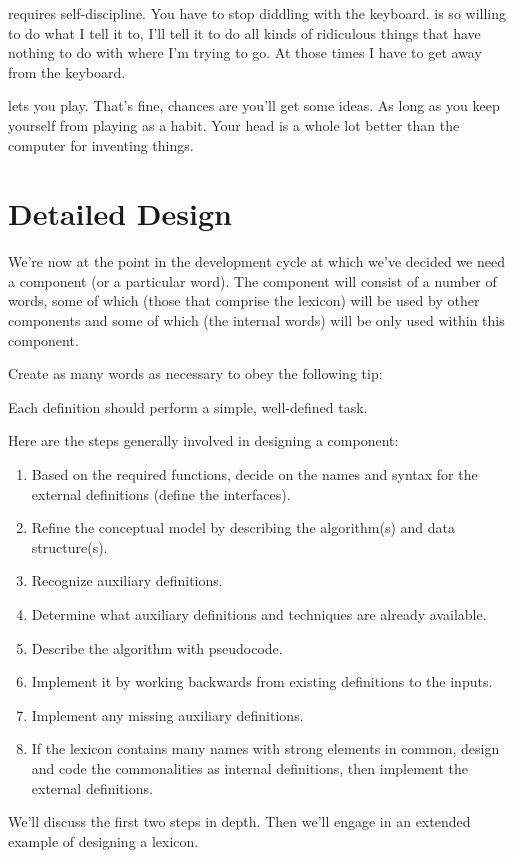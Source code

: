 \begin{interview}
\begin{tfquot}
\Forth{} requires self-discipline. You have to stop diddling with the
keyboard. \Forth{} is so willing to do what I tell it to, I'll tell it to
do all kinds of ridiculous things that have nothing to do with where I'm
trying to go. At those times I have to get away from the keyboard.

\Forth{} lets you play. That's fine, chances are you'll get some ideas. As
long as you keep yourself from playing as a habit. Your head is a whole lot
better than the computer for inventing things.
\end{tfquot}
\end{interview}%

\section{Detailed Design}%

We're now at the point in the development cycle at which we've decided
we need a component (or a particular word). The component will consist
of a number of words, some of which (those that comprise the lexicon) will
be used by other components and some of which (the internal words) will
be only used within this component.

Create as many words as necessary to obey the following tip:

\begin{tip}
Each definition should perform a simple, well-defined task.
\end{tip}%
Here are the steps generally involved in designing a component:
\begin{enumerate}
\item Based on the required functions, decide on the names and syntax for the
   external definitions (define the interfaces).
\item Refine the conceptual model by describing the algorithm(s) and data
   structure(s).
\item Recognize auxiliary definitions.
\item Determine what auxiliary definitions and techniques are already available.
\item Describe the algorithm with pseudocode.
\item Implement it by working backwards from existing definitions to the inputs.
\item Implement any missing auxiliary definitions.
\item If the lexicon contains many names with strong elements in common,
   design and code the commonalities as internal definitions, then implement
   the external definitions.
\end{enumerate}%
We'll discuss the first two steps in depth. Then we'll engage in an
extended example of designing a lexicon.


